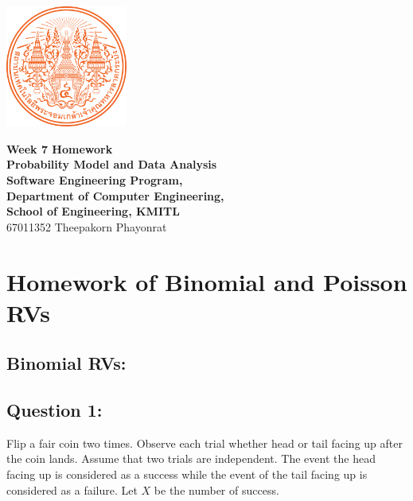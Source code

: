\documentclass[12pt]{report} %
\begin{document}
\begin{titlepage}
	\centering
	\vspace*{1cm} %
	\includegraphics[width=0.3\textwidth]{../images/KMITL Logo.png} %

	\vspace{1cm} %
	{\LARGE \textbf{Week 7 Homework}} \\[0.5cm] %
	\vspace{0.5cm}
	{\large \textbf{Probability Model and Data Analysis}} \\[0.5cm]
    {\large \textbf{Software Engineering Program,}} \\[0.5cm]
	{\large \textbf{Department of Computer Engineering,}} \\[0.5cm]
	{\large \textbf{School of Engineering, KMITL}} \\[1cm]
    {\Large 67011352 Theepakorn Phayonrat} \\[0.5cm] %
\end{titlepage}

\section*{Homework of Binomial and Poisson RVs}

\subsection*{Binomial RVs:}
\subsection*{Question 1:}

\noindent Flip a fair coin two times. Observe each trial whether head
or tail facing up after the coin lands. Assume that two trials are
independent. The event the head facing up is considered as a success
while the  event of the tail facing up is considered as a failure.
Let $X$ be the number of success. \\
\end{document}
